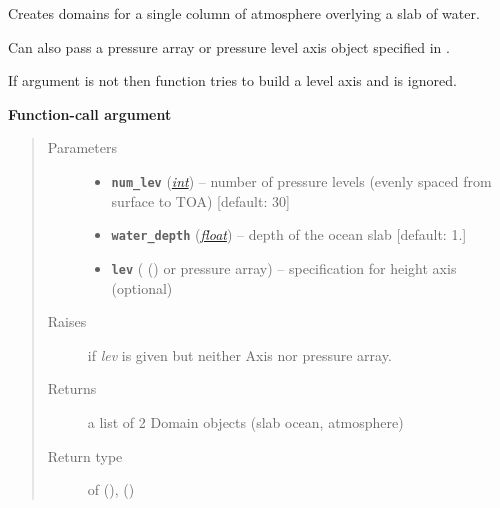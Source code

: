 \documentclass[a4paper,10pt,english]{sphinxmanual}
\begin{document}

\begin{fulllineitems}
\label{api/climlab.domain:climlab.domain.domain.single_column}
Creates domains for a single column of atmosphere overlying a slab of water.

Can also pass a pressure array or pressure level axis object specified in .

If argument  is not  then function tries to build a level axis
and  is ignored.

\textbf{Function-call argument}
\begin{quote}\begin{description}
\item[{Parameters}] \leavevmode\begin{itemize}
\item {} 
\textbf{\texttt{num\_lev}} (\href{http://docs.python.org/2.7/library/functions.html\#int}{\emph{int}}) -- number of pressure levels
(evenly spaced from surface to TOA) {[}default: 30{]}

\item {} 
\textbf{\texttt{water\_depth}} (\href{http://docs.python.org/2.7/library/functions.html\#float}{\emph{float}}) -- depth of the ocean slab {[}default: 1.{]}

\item {} 
\textbf{\texttt{lev}} ({\hyperref[api/climlab.domain:climlab.domain.axis.Axis]{\emph{}}} () or pressure array) -- specification for height axis (optional)

\end{itemize}

\item[{Raises}] \leavevmode
{}  if \emph{lev} is given but neither Axis 
nor pressure array.

\item[{Returns}] \leavevmode
a list of 2 Domain objects (slab ocean, atmosphere)

\item[{Return type}] \leavevmode
\href{http://docs.python.org/2.7/library/functions.html\#list}{} of {\hyperref[api/climlab.domain:climlab.domain.domain.SlabOcean]{\emph{}}} (), {\hyperref[api/climlab.domain:climlab.domain.domain.SlabAtmosphere]{\emph{}}} ()


\end{description}
\end{quote}
\end{fulllineitems}
\end{document}
